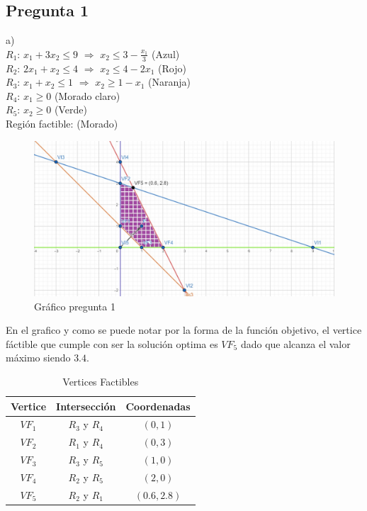 \documentclass{article}
\begin{document}
	
	\begin{flushleft}
		\section{Pregunta 1}
		a) \\
		$R_1$: $x_1 + 3x_2 \leq 9$ $\Rightarrow$ $x_2 \leq 3-\frac{x_1}{3} $ (Azul)\\
		$R_2$: $2x_1 + x_2 \leq 4$ $\Rightarrow$ $x_2 \leq 4-2x_1$ (Rojo)\\
		$R_3$: $x_1 + x_2 \leq 1$ $\Rightarrow$ $x_2 \geq 1-x_1 $ (Naranja)\\
		$R_4$: $x_1 \geq 0$ (Morado claro)\\
		$R_5$: $x_2 \geq 0$ (Verde)\\
		Región factible: (Morado)

		\vspace{0.5cm}

		\begin{figure}[ht]
			\centering
			\includegraphics[width=1.1\textwidth]{grafico1.jpg}
			\caption{Gráfico pregunta 1}
			\label{fig:grafico}
		\end{figure}
		En el grafico y como se puede notar por la forma de la función objetivo, el vertice fáctible que cumple con ser la solución optima es $VF_5$ dado que alcanza el valor máximo siendo $3.4$.\\
		\newpage
		\begin{table}[ht]
			\centering
			\begin{tabular}{ccc}
				\hline
				\textbf{Vertice} & \textbf{Intersección} & \textbf{Coordenadas} \\
				\hline
				$VF_1$ & $R_3$ y $R_4$ & $(0, 1)$ \\
				$VF_2$ & $R_1$ y $R_4$ & $(0, 3)$\\
				$VF_3$ & $R_3$ y $R_5$ & $(1, 0)$ \\
				$VF_4$ & $R_2$ y $R_5$ & $(2, 0)$ \\
				$VF_5$ & $R_2$ y $R_1$  & $(0.6, 2.8)$ \\
				\hline
			\end{tabular}
			\caption{Vertices Factibles}
			\label{tab:vertices_factibles}
		\end{table}
		

\end{flushleft}
\end{document}

